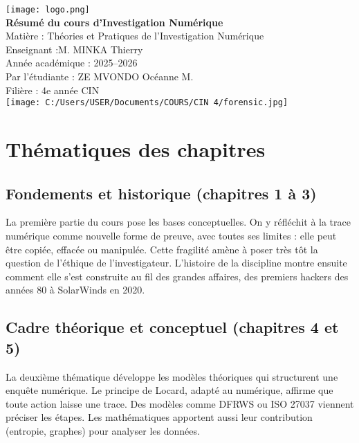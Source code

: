 \documentclass[12pt,a4paper]{report}
\begin{document}
	
	
	\begin{titlepage}
		\centering
		
	
		\texttt{[image: logo.png]}\\[2cm]
		
	
		{\Huge \textbf{Résumé du cours d’Investigation Numérique}}\\[1.5cm]
		
		
		{\Large Matière : Théories et Pratiques de
			l’Investigation Numérique}\\[0.5cm]
		{\Large Enseignant :M. MINKA Thierry}\\[0.5cm]
		{\Large Année académique : 2025--2026}\\[2cm]
		
		
		{\Large  Par l'étudiante : ZE MVONDO Océanne M.}\\[0.5cm]
		{\Large Filière : 4e année CIN }\\[2cm]
		
		
		
	 \texttt{[image: C:/Users/USER/Documents/COURS/CIN 4/forensic.jpg]}\\[4cm]
		
	
	
	\end{titlepage}
	
	\chapter*{Thématiques des chapitres}
	
	\setlength{\parskip}{1em} 
	\setlength{\parindent}{0pt} 
	
	\section*{Fondements et historique (chapitres 1 à 3)}
	La première partie du cours pose les bases conceptuelles. 
	On y réfléchit à la trace numérique comme nouvelle forme de preuve, avec toutes ses limites : 
	elle peut être copiée, effacée ou manipulée. 
	Cette fragilité amène à poser très tôt la question de l’éthique de l’investigateur. 
	L’histoire de la discipline montre ensuite comment elle s’est construite 
	au fil des grandes affaires, des premiers hackers des années 80 à SolarWinds en 2020.  
	
	\section*{Cadre théorique et conceptuel (chapitres 4 et 5)}
	La deuxième thématique développe les modèles théoriques qui structurent une enquête numérique. 
	Le principe de Locard, adapté au numérique, affirme que toute action laisse une trace. 
	Des modèles comme DFRWS ou ISO 27037 viennent préciser les étapes. 
	Les mathématiques apportent aussi leur contribution (entropie, graphes) pour analyser les données.  
	
\end{document}
